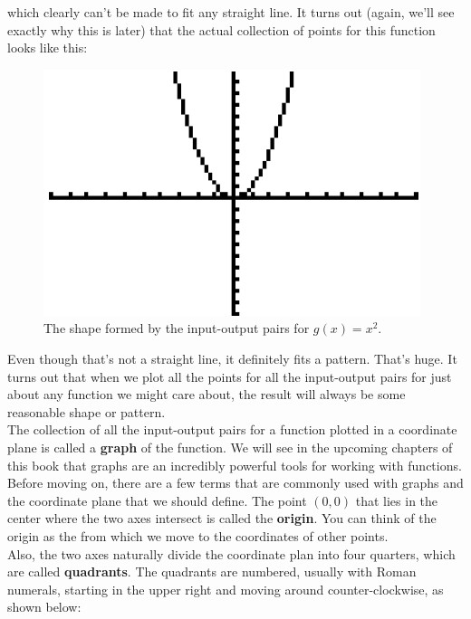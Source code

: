 which clearly can’t be made to fit any straight line. It turns out (again, we’ll see exactly why this is later) that the actual collection of points for this function looks like this:

\begin{figure}[H]
	\centering
	\includegraphics[scale=1.0]{Sections/FunctionsandGraphsImages/Figure08.png}
	\caption{The shape formed by the input-output pairs for $g(x)=x^2$.}
\end{figure}

Even though that’s not a straight line, it definitely fits a pattern. That’s huge. It turns out that when we plot all the points for all the input-output pairs for just about any function we might care about, the result will always be some reasonable shape or pattern.\\

The collection of all the input-output pairs for a function plotted in a coordinate plane is called a \textbf{graph} of the function. We will see in the upcoming chapters of this book that graphs are an incredibly powerful tools for working with functions.\\

Before moving on, there are a few terms that are commonly used with graphs and the coordinate plane that we should define. The point $(0,0)$ that lies in the center where the two axes intersect is called the \textbf{origin}. You can think of the origin as the  from which we move to the
coordinates of other points.\\

Also, the two axes naturally divide the coordinate plan into four quarters, which are called \textbf{quadrants}. The quadrants are numbered, usually with Roman numerals, starting in the upper right and moving around counter-clockwise, as shown below:

